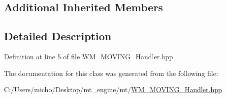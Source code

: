 \subsection*{Additional Inherited Members}


\subsection{Detailed Description}


Definition at line 5 of file W\+M\+\_\+\+M\+O\+V\+I\+N\+G\+\_\+\+Handler.\+hpp.



The documentation for this class was generated from the following file\+:\begin{DoxyCompactItemize}
\item 
C\+:/\+Users/micho/\+Desktop/mt\+\_\+engine/mt/\hyperlink{_w_m___m_o_v_i_n_g___handler_8hpp}{W\+M\+\_\+\+M\+O\+V\+I\+N\+G\+\_\+\+Handler.\+hpp}\end{DoxyCompactItemize}
